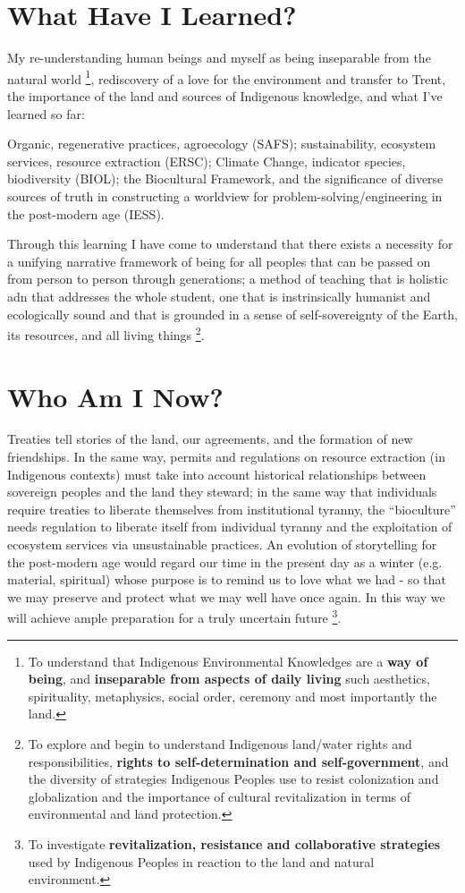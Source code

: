 \documentclass{report}
\begin{document}
\section{What Have I Learned?}

My re-understanding human beings and myself as being inseparable from the natural world \footnote{To understand that Indigenous Environmental Knowledges are a \textbf{way of being}, and \textbf{inseparable from aspects of daily living} such aesthetics, spirituality, metaphysics, social order, ceremony and most importantly the land.}, rediscovery of a love for the environment and transfer to Trent, the importance of the land and sources of Indigenous knowledge, and what I've learned so far:

Organic, regenerative practices, agroecology (SAFS); sustainability, ecosystem services, resource extraction (ERSC); Climate Change, indicator species, biodiversity (BIOL); the Biocultural Framework, and the significance of diverse sources of truth in constructing a worldview for problem-solving/engineering in the post-modern age (IESS).

Through this learning I have come to understand that there exists a necessity for a unifying narrative framework of being for all peoples that can be passed on from person to person through generations; a method of teaching that is holistic adn that addresses the whole student, one that is instrinsically humanist and ecologically sound and that is grounded in a sense of self-sovereignty of the Earth, its resources, and all living things \footnote{To explore and begin to understand Indigenous land/water rights and responsibilities, \textbf{rights to self-determination and self-government}, and the diversity of strategies Indigenous Peoples use to resist colonization and globalization and the importance of cultural revitalization in terms of environmental and land protection.}.

\section{Who Am I Now?}

Treaties tell stories of the land, our agreements, and the formation of new friendships. In the same way, permits and regulations on resource extraction (in Indigenous contexts) must take into account historical relationships between sovereign peoples and the land they steward; in the same way that individuals require treaties to liberate themselves from institutional tyranny, the ``bioculture'' needs regulation to liberate itself from individual tyranny and the exploitation of ecosystem services via unsustainable practices. An evolution of storytelling for the post-modern age would regard our time in the present day as a winter (e.g. material, spiritual) whose purpose is to remind us to love what we had - so that we may preserve and protect what we may well have once again. In this way we will achieve ample preparation for a truly uncertain future \footnote{To investigate \textbf{revitalization, resistance and collaborative strategies} used by Indigenous Peoples in reaction to the land and natural environment. }.
\end{document}
